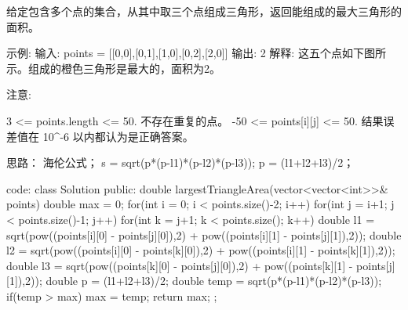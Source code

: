 给定包含多个点的集合，从其中取三个点组成三角形，返回能组成的最大三角形的面积。

示例:
输入: points = [[0,0],[0,1],[1,0],[0,2],[2,0]]
输出: 2
解释: 
这五个点如下图所示。组成的橙色三角形是最大的，面积为2。

注意:

    3 <= points.length <= 50.
    不存在重复的点。
     -50 <= points[i][j] <= 50.
    结果误差值在 10^-6 以内都认为是正确答案。






























思路：
海伦公式；
s = sqrt(p*(p-l1)*(p-l2)*(p-l3));                 p = (l1+l2+l3)/2；

























code:
class Solution {
public:
    double largestTriangleArea(vector<vector<int>>& points) {
        double max = 0;
        for(int i = 0; i < points.size()-2; i++)
        {
            for(int j = i+1; j < points.size()-1; j++)
            {
                for(int k = j+1; k < points.size(); k++)
                {
                    double l1 = sqrt(pow((points[i][0] - points[j][0]),2) + pow((points[i][1] - points[j][1]),2));
                    double l2 = sqrt(pow((points[i][0] - points[k][0]),2) + pow((points[i][1] - points[k][1]),2));
                    double l3 = sqrt(pow((points[k][0] - points[j][0]),2) + pow((points[k][1] - points[j][1]),2));
                    double p = (l1+l2+l3)/2;
                    double temp = sqrt(p*(p-l1)*(p-l2)*(p-l3));
                    if(temp > max) max = temp;
                }
            }
        }
        return max;
    }
};